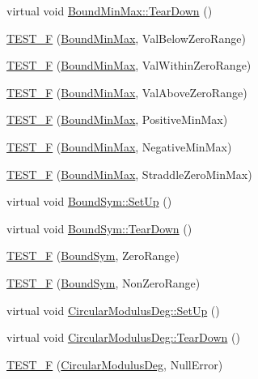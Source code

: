 \begin{DoxyCompactItemize}
virtual void \hyperlink{group___unit_tests_ga5b1a04dbcaaa9db5e928c59c87d81a69}{\-Bound\-Min\-Max\-::\-Tear\-Down} ()
\item 
\hyperlink{group___unit_tests_ga616b42d75c14427fb433a0efc0dcc8d0}{\-T\-E\-S\-T\-\_\-\-F} (\hyperlink{class_bound_min_max}{\-Bound\-Min\-Max}, \-Val\-Below\-Zero\-Range)
\item 
\hyperlink{group___unit_tests_ga7b82883b4c8ff0d533a5b3923e8845fd}{\-T\-E\-S\-T\-\_\-\-F} (\hyperlink{class_bound_min_max}{\-Bound\-Min\-Max}, \-Val\-Within\-Zero\-Range)
\item 
\hyperlink{group___unit_tests_ga132356b391d86ecdf50208ce16363129}{\-T\-E\-S\-T\-\_\-\-F} (\hyperlink{class_bound_min_max}{\-Bound\-Min\-Max}, \-Val\-Above\-Zero\-Range)
\item 
\hyperlink{group___unit_tests_gaa62459355b2c84ef788d4bb84f924458}{\-T\-E\-S\-T\-\_\-\-F} (\hyperlink{class_bound_min_max}{\-Bound\-Min\-Max}, \-Positive\-Min\-Max)
\item 
\hyperlink{group___unit_tests_ga55f8b8b58267f37c46e74ff9a02c3552}{\-T\-E\-S\-T\-\_\-\-F} (\hyperlink{class_bound_min_max}{\-Bound\-Min\-Max}, \-Negative\-Min\-Max)
\item 
\hyperlink{group___unit_tests_ga2bfe3239906784d1c3bc974c164a8ac1}{\-T\-E\-S\-T\-\_\-\-F} (\hyperlink{class_bound_min_max}{\-Bound\-Min\-Max}, \-Straddle\-Zero\-Min\-Max)
\item 
virtual void \hyperlink{group___unit_tests_ga3b1ffcc33db9c2489206486310736009}{\-Bound\-Sym\-::\-Set\-Up} ()
\item 
virtual void \hyperlink{group___unit_tests_gac3c27344e8473b0cfba42ddd7e28b509}{\-Bound\-Sym\-::\-Tear\-Down} ()
\item 
\hyperlink{group___unit_tests_gadd176ad6c420571ec24f5b96f9578e5b}{\-T\-E\-S\-T\-\_\-\-F} (\hyperlink{class_bound_sym}{\-Bound\-Sym}, \-Zero\-Range)
\item 
\hyperlink{group___unit_tests_ga548005fd2118ab3d1421a52580886532}{\-T\-E\-S\-T\-\_\-\-F} (\hyperlink{class_bound_sym}{\-Bound\-Sym}, \-Non\-Zero\-Range)
\item 
virtual void \hyperlink{group___unit_tests_gade916660611f66dc899b964b8d064166}{\-Circular\-Modulus\-Deg\-::\-Set\-Up} ()
\item 
virtual void \hyperlink{group___unit_tests_gab07ca9308f02057fa2623a51eb709aac}{\-Circular\-Modulus\-Deg\-::\-Tear\-Down} ()
\item 
\hyperlink{group___unit_tests_ga17693a11d324ba463ae792d590bee714}{\-T\-E\-S\-T\-\_\-\-F} (\hyperlink{class_circular_modulus_deg}{\-Circular\-Modulus\-Deg}, \-Null\-Error)

\end{DoxyCompactItemize}
